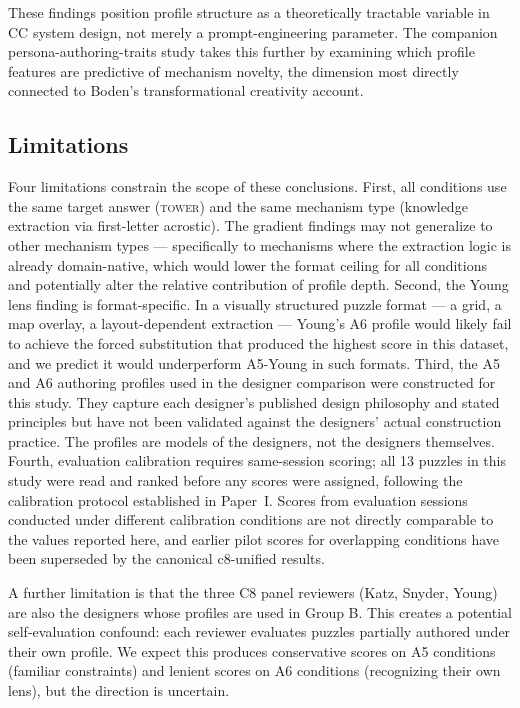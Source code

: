 These findings position profile structure as a theoretically tractable variable in CC system design, not merely a prompt-engineering parameter. The companion persona-authoring-traits study takes this further by examining which profile features are predictive of mechanism novelty, the dimension most directly connected to Boden's transformational creativity account.

\subsection{Limitations}

Four limitations constrain the scope of these conclusions. First, all conditions use the same target answer (\textsc{tower}) and the same mechanism type (knowledge extraction via first-letter acrostic). The gradient findings may not generalize to other mechanism types — specifically to mechanisms where the extraction logic is already domain-native, which would lower the format ceiling for all conditions and potentially alter the relative contribution of profile depth. Second, the Young lens finding is format-specific. In a visually structured puzzle format — a grid, a map overlay, a layout-dependent extraction — Young's A6 profile would likely fail to achieve the forced substitution that produced the highest score in this dataset, and we predict it would underperform A5-Young in such formats. Third, the A5 and A6 authoring profiles used in the designer comparison were constructed for this study. They capture each designer's published design philosophy and stated principles but have not been validated against the designers' actual construction practice. The profiles are models of the designers, not the designers themselves. Fourth, evaluation calibration requires same-session scoring; all 13 puzzles in this study were read and ranked before any scores were assigned, following the calibration protocol established in Paper~I. Scores from evaluation sessions conducted under different calibration conditions are not directly comparable to the values reported here, and earlier pilot scores for overlapping conditions have been superseded by the canonical c8-unified results.

A further limitation is that the three C8 panel reviewers (Katz, Snyder, Young) are also the designers whose profiles are used in Group B. This creates a potential self-evaluation confound: each reviewer evaluates puzzles partially authored under their own profile. We expect this produces conservative scores on A5 conditions (familiar constraints) and lenient scores on A6 conditions (recognizing their own lens), but the direction is uncertain.
